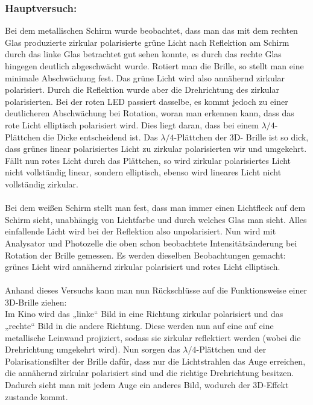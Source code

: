 \documentclass[fontsize=12pt]{scrartcl}
\begin{document}
\subsubsection{Hauptversuch:}
Bei dem metallischen Schirm wurde beobachtet, dass man das mit dem rechten Glas produzierte zirkular polarisierte grüne Licht nach Reflektion am Schirm 
durch das linke Glas betrachtet gut sehen konnte, es durch das rechte Glas hingegen deutlich abgeschwächt wurde. Rotiert man die Brille, so stellt man eine 
minimale Abschwächung fest. Das grüne Licht wird also annähernd zirkular polarisiert. Durch die Reflektion wurde aber die Drehrichtung des zirkular 
polarisierten. Bei der roten LED passiert dasselbe, es kommt jedoch zu einer deutlicheren Abschwächung bei Rotation, woran man erkennen kann, dass das 
rote Licht elliptisch polarisiert wird. Dies liegt daran, dass bei einem $\lambda/4$-Plättchen die Dicke entscheidend ist. Das $\lambda/4$-Plättchen der 3D-
Brille ist so dick, dass grünes linear polarisiertes Licht zu zirkular polarisierten wir und umgekehrt. Fällt nun rotes Licht durch das Plättchen, so wird zirkular 
polarisiertes Licht nicht vollständig linear, sondern elliptisch, ebenso wird lineares Licht nicht vollständig zirkular. \\
~\\
Bei dem weißen Schirm stellt man fest, dass man immer einen Lichtfleck auf dem Schirm sieht, unabhängig von Lichtfarbe und durch welches Glas man sieht. 
Alles einfallende Licht wird bei der Reflektion also unpolarisiert. Nun wird mit Analysator und Photozelle die oben schon beobachtete Intensitätsänderung bei 
Rotation der Brille gemessen. Es werden dieselben Beobachtungen gemacht: grünes Licht wird annähernd zirkular polarisiert und rotes Licht elliptisch.\\
~\\
Anhand dieses Versuchs kann man nun Rückschlüsse auf die Funktionsweise einer 3D-Brille ziehen:\\
Im Kino wird das „linke“ Bild in eine Richtung zirkular polarisiert und das „rechte“ Bild in die andere Richtung. Diese werden nun auf eine auf eine metallische 
Leinwand projiziert, sodass sie zirkular reflektiert werden (wobei die Drehrichtung umgekehrt wird). Nun sorgen das $\lambda/4$-Plättchen und der 
Polarisationsfilter der Brille dafür, dass nur die Lichtstrahlen das Auge erreichen, die annähernd zirkular polarisiert sind und die richtige Drehrichtung besitzen. 
Dadurch sieht man mit jedem Auge ein anderes Bild, wodurch der 3D-Effekt zustande kommt.\\
\end{document}
